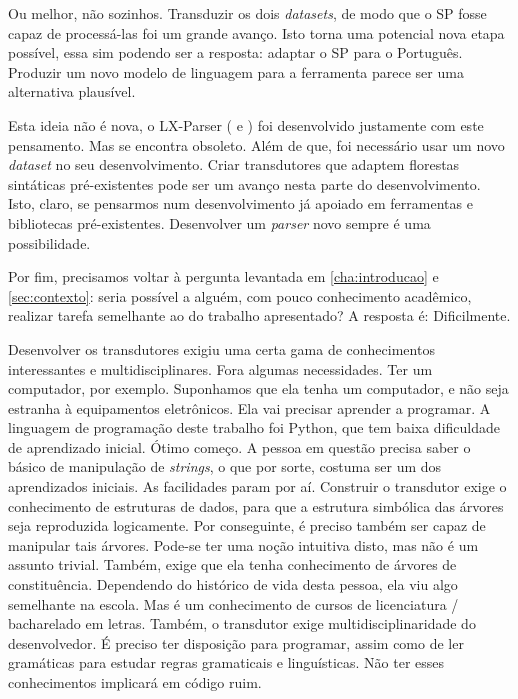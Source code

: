 Ou melhor, não sozinhos. Transduzir os dois \textit{datasets}, de modo que o SP fosse capaz de processá-las foi um grande avanço. Isto torna uma potencial nova etapa possível, essa sim podendo ser a resposta: adaptar o SP para o Português. Produzir um novo modelo de linguagem para a ferramenta parece ser uma alternativa plausível.

Esta ideia não é nova, o LX-Parser ( e ) foi desenvolvido justamente com este pensamento. Mas se encontra obsoleto. Além de que, foi necessário usar um novo \textit{dataset} no seu desenvolvimento. Criar transdutores que adaptem florestas sintáticas pré-existentes pode ser um avanço nesta parte do desenvolvimento. Isto, claro, se pensarmos num desenvolvimento já apoiado em ferramentas e bibliotecas pré-existentes. Desenvolver um \textit{parser} novo sempre é uma possibilidade.

Por fim, precisamos voltar à pergunta levantada em \ref{cha:introducao} e \ref{sec:contexto}: seria possível a alguém, com pouco conhecimento acadêmico, realizar tarefa semelhante ao do trabalho apresentado? A resposta é: Dificilmente. 

Desenvolver os transdutores exigiu uma certa gama de conhecimentos interessantes e multidisciplinares. Fora algumas necessidades. Ter um computador, por exemplo. Suponhamos que ela tenha um computador, e não seja estranha à equipamentos eletrônicos. Ela vai precisar aprender a programar. A linguagem de programação deste trabalho foi Python, que tem baixa dificuldade de aprendizado inicial. Ótimo começo. A pessoa em questão precisa saber o básico de manipulação de \textit{strings}, o que por sorte, costuma ser um dos aprendizados iniciais. As facilidades param por aí. Construir o transdutor exige o conhecimento de estruturas de dados, para que a estrutura simbólica das árvores seja reproduzida logicamente. Por conseguinte, é preciso também ser capaz de manipular tais árvores. Pode-se ter uma noção intuitiva disto, mas não é um assunto trivial. Também, exige que ela tenha conhecimento de árvores de constituência. Dependendo do histórico de vida desta pessoa, ela viu algo semelhante na escola. Mas é um conhecimento de cursos de licenciatura / bacharelado em letras. Também, o transdutor exige multidisciplinaridade do desenvolvedor. É preciso ter disposição para programar, assim como de ler gramáticas para estudar regras gramaticais e linguísticas. Não ter esses conhecimentos implicará em código ruim. 

